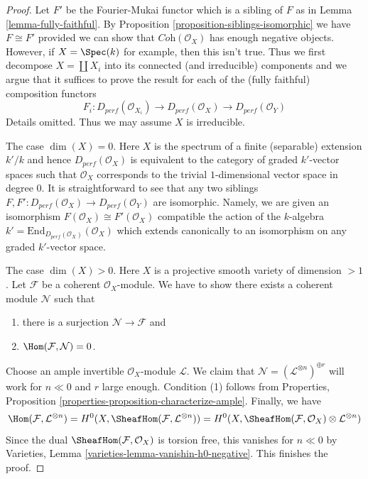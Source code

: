 \begin{proof}
Let $F'$ be the Fourier-Mukai functor which is a sibling of $F$
as in Lemma \ref{lemma-fully-faithful}.
By Proposition \ref{proposition-siblings-isomorphic} we have $F \cong F'$
provided we can show that $\textit{Coh}(\mathcal{O}_X)$ has enough
negative objects. However, if $X = \Spec(k)$ for example, then
this isn't true. Thus we first decompose $X = \coprod X_i$
into its connected (and irreducible) components and we
argue that it suffices to prove the result for each of the
(fully faithful) composition functors
$$
F_i :
D_{perf}(\mathcal{O}_{X_i}) \to
D_{perf}(\mathcal{O}_X) \to
D_{perf}(\mathcal{O}_Y)
$$
Details omitted. Thus we may assume $X$ is irreducible.

\medskip\noindent
The case $\dim(X) = 0$. Here $X$ is the spectrum of a finite (separable)
extension $k'/k$ and hence $D_{perf}(\mathcal{O}_X)$
is equivalent to the category
of graded $k'$-vector spaces such that $\mathcal{O}_X$ corresponds to the
trivial $1$-dimensional vector space in degree $0$.
It is straightforward to see that any two
siblings $F, F' : D_{perf}(\mathcal{O}_X) \to D_{perf}(\mathcal{O}_Y)$
are isomorphic. Namely, we are given an isomorphism
$F(\mathcal{O}_X) \cong F'(\mathcal{O}_X)$
compatible the action of the $k$-algebra
$k' = \text{End}_{D_{perf}(\mathcal{O}_X)}(\mathcal{O}_X)$
which extends canonically to an isomorphism on any graded $k'$-vector space.

\medskip\noindent
The case $\dim(X) > 0$. Here $X$ is a projective smooth
variety of dimension $> 1$. Let $\mathcal{F}$ be a coherent
$\mathcal{O}_X$-module. We have to show there exists a
coherent module $\mathcal{N}$ such that
\begin{enumerate}
\item there is a surjection $\mathcal{N} \to \mathcal{F}$ and
\item $\Hom(\mathcal{F}, \mathcal{N}) = 0$.
\end{enumerate}
Choose an ample invertible $\mathcal{O}_X$-module $\mathcal{L}$.
We claim that $\mathcal{N} = (\mathcal{L}^{\otimes n})^{\oplus r}$
will work for $n \ll 0$ and $r$ large enough.
Condition (1) follows from
Properties, Proposition \ref{properties-proposition-characterize-ample}.
Finally, we have
$$
\Hom(\mathcal{F}, \mathcal{L}^{\otimes n}) =
H^0(X, \SheafHom(\mathcal{F}, \mathcal{L}^{\otimes n})) =
H^0(X, \SheafHom(\mathcal{F}, \mathcal{O}_X) \otimes \mathcal{L}^{\otimes n})
$$
Since the dual $\SheafHom(\mathcal{F}, \mathcal{O}_X)$ is torsion free, this
vanishes for $n \ll 0$ by Varieties, Lemma 
\ref{varieties-lemma-vanishin-h0-negative}. This finishes the proof.
\end{proof}

